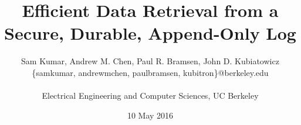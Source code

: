 \documentclass{acm_proc_article-sp}
\begin{document}
\title{Efficient Data Retrieval from a Secure, Durable, Append-Only Log
}
%
%
%
%
%

%


\author{
\begin{tabular}{cc}
Sam Kumar,
Andrew M. Chen,
Paul R. Bramsen,
John D. Kubiatowicz\\
\{samkumar, andrewmchen, paulbramsen, kubitron\}@berkeley.edu\\ \\
Electrical Engineering and Computer Sciences, UC Berkeley\\
\end{tabular}
}
\date{10 May 2016}
\end{document}
